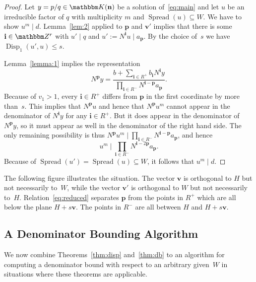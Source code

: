 \documentclass[a4paper]{sig-alternate}
\let\set\mathbbm
\def\vec#1{\mathbf{#1}}
\def\spread{\operatorname{Spread}}
\def\disp{\operatorname{Disp}}
\begin{document}
\begin{proof}
  Let $y=p/q\in\set K(\vec n)$ be a solution of~\eqref{eq:main} and let $u$ be an irreducible
  factor of $q$ with multiplicity $m$ and $\spread(u)\subseteq W$.
  We have to show $u^m\mid d$.
  Lemma~\ref{lem:2} applied to $\vec p$ and $\vec v'$ implies that there is some $\vec i\in\set Z^r$
  with $u'\mid q$ and $u':=N^{\vec i}u\mid a_{\vec p}$.
  By the choice of~$s$ we have $\disp_1(u',u)\leq s$.

  Lemma~\ref{lemma:1} implies the representation
  \[
    N^{\vec p}y=\frac{b+\sum_{\vec i\in R^+}b_{\vec i}N^{\vec i}y}
                    {\prod_{\vec i\in R^-}N^{\vec i-\vec p} a_{\vec p}}.
  \]
  Because of $v_1>1$, every $\vec i\in R^+$ differs from $\vec p$ in the first coordinate
  by more than~$s$. This implies that $N^{\vec p}u$ and hence that $N^{\vec p}u^m$ cannot appear in the denominator of
  $N^{\vec i}y$ for any $\vec i\in R^+$. But it does appear in the denominator of~$N^{\vec p}y$,
  so it must appear as well in the denominator of the right hand side.
  The only remaining possibility is thus
  $N^{\vec p}u^m\mid \prod_{\vec i\in R^-}N^{\vec i-\vec p} a_{\vec p}$,
  and hence
  \[
    u^m\mid\prod_{\vec i\in R^-}N^{\vec i-2\vec p}a_{\vec p}.
  \]
  Because of $\spread(u')=\spread(u)\subseteq W$, it follows that $u^m\mid d$.
\end{proof}

The following figure illustrates the situation. The vector $\vec v$ is orthogonal to $H$
but not necessarily to~$W$, while the vector $\vec v'$ is orthogonal to $W$ but not
necessarily to~$H$.
Relation~\eqref{eq:reduced} separates $\vec p$ from the points in $R^+$ which are all below
the plane $H+s\vec v$. The points in $R^-$ are all between $H$ and $H+s\vec v$.

\medskip
\centerline{}

\medskip

\subsection{A Denominator Bounding Algorithm}

We now combine Theorems~\ref{thm:disp} and~\ref{thm:db} to an algorithm
for computing a denominator bound with respect to an arbitrary given~$W$
in situations where these theorems are applicable.
\end{document}
